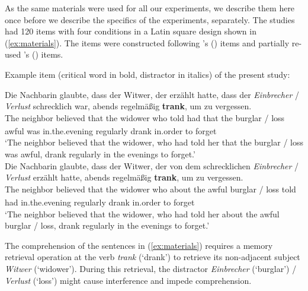 \documentclass[review,preprint,12pt,authoryear,floatsintext]{elsarticle}
\begin{document}
As the same materials were used for all our experiments, we describe them here once before we describe the specifics of the experiments, separately. The studies had 120 items with four conditions in a Latin square design shown in (\ref{ex:materials}). The items were constructed following \citeauthor{vandyke07}'s (\citeyear{vandyke07}) items and partially re-used  \citeauthor{mertzen}'s (\citeyear{mertzen}) items.

\begin{exe}  
\ex \label{ex:materials} Example item (critical word in bold, distractor in italics) of the present study:
    \begin{xlist}   
    \label{ex:hisyn} 
    \gll Die  Nachbarin glaubte,	dass	der Witwer,  der  erzählt hatte, dass der \textit{Einbrecher} / \textit{Verlust}  schrecklich war, abends regelmäßig \textbf{trank}, um zu vergessen.\\ 
    The\textsubscript{} neighbor\textsubscript{} believed that the widower who told had that the burglar / loss awful was in.the.evening regularly drank in.order to forget \\
    \trans `The neighbor believed that the widower, who had told her that the burglar / loss was awful, drank regularly in the evenings to forget.' \\
    
    \label{ex:losyn} 
    \gll Die  Nachbarin glaubte, dass der Witwer,  der  von    dem schrecklichen \textit{Einbrecher} / \textit{Verlust} erzählt hatte, abends regelmäßig \textbf{trank}, um zu vergessen. \\ 
    The\textsubscript{} neighbor\textsubscript{} believed that the widower who about the awful burglar / loss told had in.the.evening regularly drank in.order to forget\\
    \trans `The neighbor believed that the widower, who had told her about the awful burglar / loss, drank regularly in the evenings to forget.'  \\
    \end{xlist}
\end{exe}

The comprehension of the sentences in (\ref{ex:materials}) requires a memory retrieval operation at the verb \textit{trank} (`drank') to retrieve its non-adjacent subject \textit{Witwer} (`widower'). During this retrieval, the distractor \textit{Einbrecher} (`burglar') / \textit{Verlust} (`loss') might cause interference and impede comprehension. 
\end{document}
